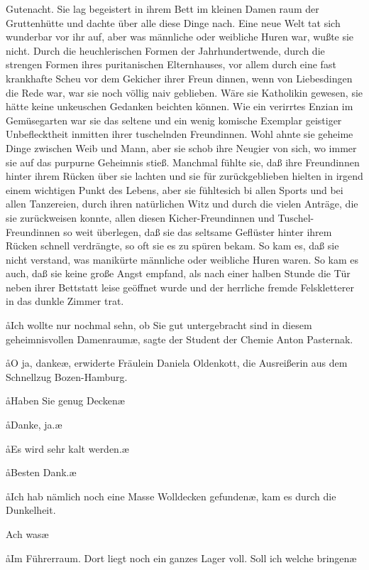 Gutenacht. Sie lag begeistert in ihrem Bett im kleinen Damen\-%
raum der Gruttenhütte und dachte über alle diese Dinge nach.
Eine neue Welt tat sich wunderbar vor ihr auf, aber was
männliche oder weibliche Huren war, wußte sie nicht. Durch
die heuchlerischen Formen der Jahrhundertwende, durch die
strengen Formen ihres puritanischen Elternhauses, vor allem
durch eine fast krankhafte Scheu vor dem Gekicher ihrer Freun\-%
dinnen, wenn von Liebesdingen die Rede war, war sie noch
völlig naiv geblieben. Wäre sie Katholikin gewesen, sie hätte
keine unkeuschen Gedanken beichten können. Wie ein verirrtes
Enzian im Gemüsegarten war sie das seltene und ein wenig
komische Exemplar geistiger Unbeflecktheit inmitten ihrer
tuschelnden Freundinnen. Wohl ahnte sie geheime Dinge
zwischen Weib und Mann, aber sie schob ihre Neugier von sich,
wo immer sie auf das purpurne Geheimnis stieß. Manchmal
fühlte sie, daß ihre Freundinnen hinter ihrem Rücken über
sie lachten und sie für zurückgeblieben hielten in irgend einem
wichtigen Punkt des Lebens, aber sie fühltesich bi allen
Sports und bei allen Tanzereien, durch ihren natürlichen
Witz und durch die vielen Anträge, die sie zurückweisen konnte,
allen diesen Kicher-Freundinnen und Tuschel-Freundinnen
so weit überlegen, daß sie das seltsame Geflüster hinter ihrem
Rücken schnell verdrängte, so oft sie es zu spüren bekam. So
kam es, daß sie nicht verstand, was manikürte männliche oder
weibliche Huren waren. So kam es auch, daß sie keine große
Angst empfand, als nach einer halben Stunde die Tür neben
ihrer Bettstatt leise geöffnet wurde und der herrliche fremde
Felskletterer in das dunkle Zimmer trat.

\aa Ich wollte nur nochmal sehn, ob Sie gut untergebracht sind
in diesem geheimnisvollen Damenraum\ae, sagte der Student
der Chemie Anton Pasternak.

\aa O ja, danke\ae, erwiderte Fräulein Daniela Oldenkott, die
Ausreißerin aus dem Schnellzug Bozen-Hamburg.

\aa Haben Sie genug Decken\frag\ae

\aa Danke, ja.\ae

\aa Es wird sehr kalt werden.\ae

\aa Besten Dank.\ae

\aa Ich hab nämlich noch eine Masse Wolldecken gefunden\ae, kam
es durch die Dunkelheit.

\aanah Ach was\frag\ae

\aa Im Führerraum. Dort liegt noch ein ganzes Lager voll. Soll
ich welche bringen\frag\ae


